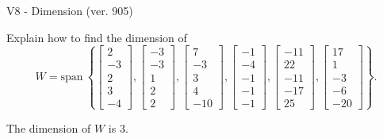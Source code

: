 \begin{exercise}
  \begin{exerciseTitle}V8 - Dimension (ver. 905)\end{exerciseTitle}
  \begin{exerciseStatement}
    Explain how to find the dimension of 
\[W=\mathrm{span}\ \left\{\left[\begin{array}{r}
2 \\
-3 \\
2 \\
3 \\
-4
\end{array}\right] , \left[\begin{array}{r}
-3 \\
-3 \\
1 \\
2 \\
2
\end{array}\right] , \left[\begin{array}{r}
7 \\
-3 \\
3 \\
4 \\
-10
\end{array}\right] , \left[\begin{array}{r}
-1 \\
-4 \\
-1 \\
-1 \\
-1
\end{array}\right] , \left[\begin{array}{r}
-11 \\
22 \\
-11 \\
-17 \\
25
\end{array}\right] , \left[\begin{array}{r}
17 \\
1 \\
-3 \\
-6 \\
-20
\end{array}\right]\right\}.\]



  \end{exerciseStatement}
  \begin{exerciseAnswer}
   The dimension of \(W\) is  \(3\).
  


  \end{exerciseAnswer}
\end{exercise}